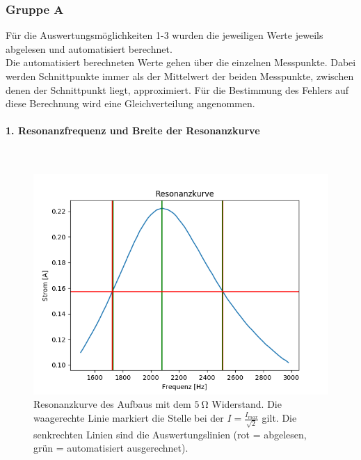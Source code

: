 \documentclass[12pt,a4paper]{article}
\begin{document}
\subsubsection{Gruppe A}
Für die Auswertungsmöglichkeiten 1-3 wurden die jeweiligen Werte jeweils abgelesen und automatisiert berechnet.\\
Die automatisiert berechneten Werte gehen über die einzelnen Messpunkte. Dabei werden Schnittpunkte immer als der Mittelwert der beiden Messpunkte, zwischen denen der Schnittpunkt liegt, approximiert. Für die Bestimmung des Fehlers auf diese Berechnung wird eine Gleichverteilung angenommen.\\

\paragraph{1. Resonanzfrequenz und Breite der Resonanzkurve}\mbox{}\\
\begin{figure}
\centering
\includegraphics[scale=0.8]{Bilder/Serie_Resonanzkurve_A_5.png}
\caption{Resonanzkurve des Aufbaus mit dem $\SI{5}{\ohm}$ Widerstand. Die waagerechte Linie markiert die Stelle bei der $I = \frac{I_{max}}{\sqrt{2}}$ gilt. Die senkrechten Linien sind die Auswertungslinien (rot = abgelesen, grün = automatisiert ausgerechnet).}
\label{fig:Serie_Resonanzkurve_A_5}
\end{figure}
\end{document}
